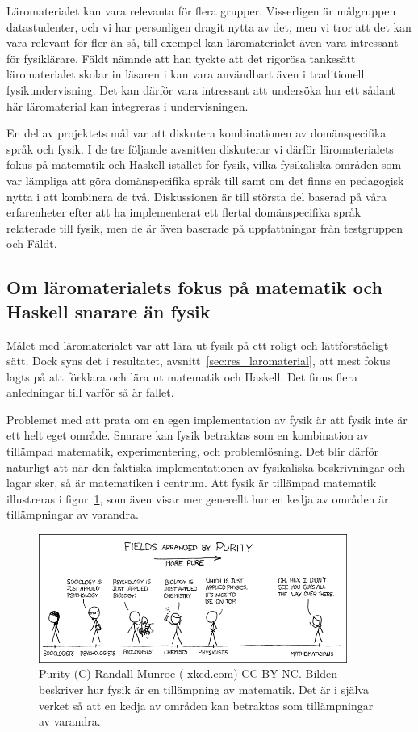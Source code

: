 Läromaterialet kan vara relevanta för flera grupper. Visserligen är målgruppen datastudenter, och vi har personligen dragit nytta av det,
men vi tror att det kan vara relevant för fler än så, till exempel kan läromaterialet även vara intressant för fysiklärare. Fäldt nämnde att han
tyckte att det rigorösa tankesätt läromaterialet skolar in läsaren i kan vara
användbart även i traditionell fysikundervisning. Det kan därför vara intressant att undersöka hur ett sådant här läromaterial kan
integreras i undervisningen.

En del av projektets mål var att diskutera kombinationen av
domänspecifika språk och fysik. I de tre följande avsnitten diskuterar vi därför
läromaterialets fokus på matematik och Haskell istället för fysik, vilka
fysikaliska områden som var lämpliga att göra domänspecifika språk till samt om
det finns en pedagogisk nytta i att kombinera de två. Diskussionen är till
största del baserad på våra erfarenheter efter att ha implementerat ett flertal
domänspecifika språk relaterade till fysik, men de är även baserade på
uppfattningar från testgruppen och Fäldt.


\subsection{Om läromaterialets fokus på matematik och Haskell snarare än
fysik}\label{sec:fpf}

Målet med läromaterialet var att lära ut fysik på ett roligt och
lättförståeligt sätt. Dock syns det i resultatet,
avsnitt~\ref{sec:res_laromaterial}, att mest fokus lagts på att
förklara och lära ut matematik och Haskell. Det finns
flera anledningar till varför så är fallet.

Problemet med att prata om en egen implementation av fysik är att
fysik inte är ett helt eget område. Snarare kan fysik betraktas som en
kombination av tillämpad matematik, experimentering, och
problemlösning. Det blir därför naturligt att när den faktiska
implementationen av fysikaliska beskrivningar och lagar sker, så är
matematiken i centrum. Att fysik är tillämpad matematik illustreras i
figur~\ref{fig:xkcd}, som även visar mer generellt hur en kedja av
områden är tillämpningar av varandra.

\begin{figure}[tph]
  \centering
  \includegraphics[width=0.9\textwidth]{figure/purity.png}
  \caption{\href{https://xkcd.com/435/}{Purity} (C) Randall Munroe (
  \href{https://xkcd.com}{xkcd.com}) \href{https://creativecommons.org/licenses/by-nc/2.5/}{CC BY-NC}. Bilden beskriver hur fysik är en tillämpning av matematik. Det är i själva verket
så att en kedja av områden kan betraktas som tillämpningar av
varandra.}\label{fig:xkcd}
\end{figure}

